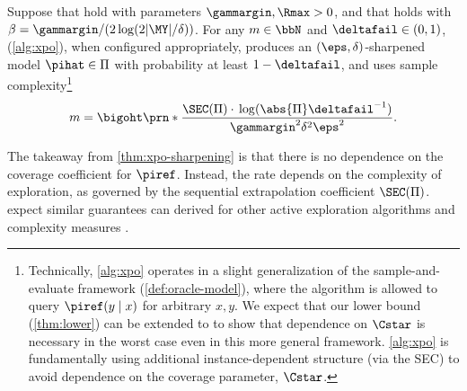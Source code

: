


\begin{theorem}\label{thm:xpo-sharpening}
Suppose that  hold with parameters $\gammargin,\Rmax>0$, and that
 holds with $\beta 
= \gammargin/(2\log(2|\MY|/\delta))$. For any $m\in\bbN$ and $\deltafail\in(0,1)$, \xpo
(\cref{alg:xpo}), when configured appropriately, produces an
$(\eps,\delta)$-sharpened model $\pihat \in \Pi$ with probability at
least $1-\deltafail$, and uses sample complexity\footnote{Technically, \cref{alg:xpo} operates in a slight generalization of the sample-and-evaluate framework (\cref{def:oracle-model}), where the algorithm is allowed to query $\piref(y\mid{} x)$ for arbitrary $x,y$. We expect that our lower bound (\cref{thm:lower}) can be extended to to show that dependence on $\Cstar$ is necessary in the worst case even in this more general framework. \cref{alg:xpo} is fundamentally using additional instance-dependent structure (via the SEC) to avoid dependence on the coverage parameter, $\Cstar$.} \[m = \bigoht\prn*{\frac{\SEC(\Pi)\cdot{}\log(\abs{\Pi}\deltafail^{-1})}{\gammargin^2\delta^2\eps^2}}.\]

\end{theorem}
The takeaway from \cref{thm:xpo-sharpening} is that there is no
dependence on the coverage coefficient for $\piref$. Instead,
the rate depends on the complexity of exploration, as governed by the
sequential extrapolation coefficient $\SEC(\Pi)$.  expect similar guarantees can
derived for other active exploration algorithms and complexity
measures \citep{jiang2017contextual,foster2021statistical,jin2021bellman,xie2023role}.\loose


